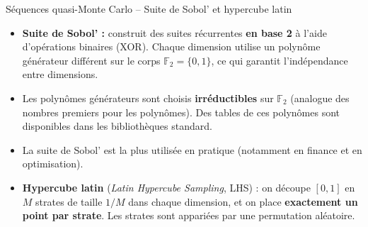 \documentclass[11pt,aspectratio=169]{beamer}
\begin{document}
\begin{frame}{Séquences quasi-Monte Carlo -- Suite de Sobol' et hypercube latin}

\begin{itemize}

\item \textbf{Suite de Sobol' :} construit des suites récurrentes \textbf{en base 2} à l'aide d'opérations binaires (XOR). Chaque dimension utilise un polynôme générateur différent sur le corps $\mathbb{F}_2 = \{0, 1\}$, ce qui garantit l'indépendance entre dimensions.\newline

\item Les polynômes générateurs sont choisis \textbf{irréductibles} sur $\mathbb{F}_2$ (analogue des nombres premiers pour les polynômes). Des tables de ces polynômes sont disponibles dans les bibliothèques standard.\newline

\item La suite de Sobol' est la plus utilisée en pratique (notamment en finance et en optimisation).\newline

\item \textbf{Hypercube latin} (\textit{Latin Hypercube Sampling}, LHS) : on découpe $[0,1]$ en $M$ strates de taille $1/M$ dans chaque dimension, et on place \textbf{exactement un point par strate}. Les strates sont appariées par une permutation aléatoire.

\end{itemize}

\end{frame}
\end{document}
